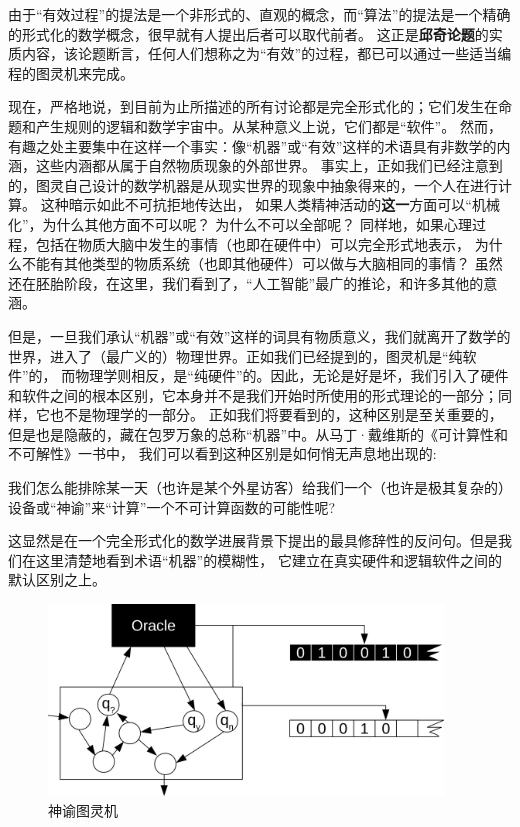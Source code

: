 \documentclass[a4paper,12pt]{article}
\begin{document}
由于“有效过程”的提法是一个非形式的、直观的概念，而“算法”的提法是一个精确的形式化的数学概念，很早就有人提出后者可以取代前者。
这正是\textbf{\gls{邱奇论题}}的实质内容\cite{KleeneSC1952}，该论题断言，任何人们想称之为“有效”的过程，都已可以通过一些适当编程的图灵机来完成。

现在，严格地说，到目前为止所描述的所有讨论都是完全形式化的；它们发生在命题和产生规则的逻辑和数学宇宙中。从某种意义上说，它们都是“软件”。
然而，有趣之处主要集中在这样一个事实：像“机器”或“有效”这样的术语具有非数学的内涵，这些内涵都从属于自然物质现象的外部世界。
事实上，正如我们已经注意到的，图灵自己设计的数学机器是从现实世界的现象中抽象得来的，一个人在进行计算。
这种暗示如此不可抗拒地传达出， 如果人类精神活动的\textbf{这一}方面可以“机械化”，为什么其他方面不可以呢？ 为什么不可以全部呢？
同样地，如果心理过程，包括在物质大脑中发生的事情（也即在硬件中）可以完全形式地表示，
为什么不能有其他类型的物质系统（也即其他硬件）可以做与大脑相同的事情？
虽然还在胚胎阶段，在这里，我们看到了，“人工智能”最广的推论，和许多其他的意涵。

但是，一旦我们承认“机器”或“有效”这样的词具有物质意义，我们就离开了数学的世界，进入了（最广义的）物理世界。正如我们已经提到的，图灵机是“纯软件”的，
而物理学则相反，是“纯硬件”的。因此，无论是好是坏，我们引入了硬件和软件之间的根本区别，它本身并不是我们开始时所使用的形式理论的一部分；同样，它也不是物理学的一部分。
正如我们将要看到的，这种区别是至关重要的，但是也是隐蔽的，藏在包罗万象的总称“机器”中。从马丁·戴维斯的《可计算性和不可解性》\cite{DavisM1958}一书中，
我们可以看到这种区别是如何悄无声息地出现的:

\begin{displayquote}
    我们怎么能排除某一天（也许是某个外星访客）给我们一个（也许是极其复杂的）设备或“神谕”来“计算”一个不可计算函数的可能性呢?
\end{displayquote}

这显然是在一个完全形式化的数学进展背景下提出的最具修辞性的反问句。但是我们在这里清楚地看到术语“机器”的模糊性，
它建立在真实硬件和逻辑软件之间的默认区别之上。

\begin{figure}[ht]
\centering
\includegraphics[height=2.0in]{images/turing_machine_oracle.png}
\caption{\gls{神谕图灵机}}
\end{figure}
\end{document}
